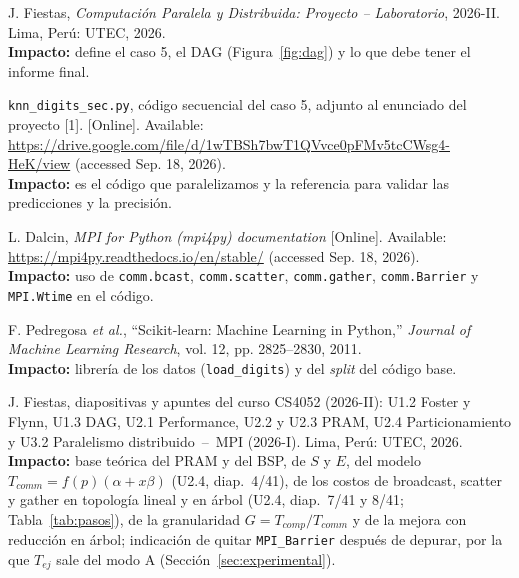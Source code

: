 \documentclass[11pt,a4paper]{article}
\begin{document}
\begin{enumerate}[label={[\arabic*]}, leftmargin=*, itemsep=2pt, parsep=0pt, topsep=2pt]
  \item J. Fiestas, \textit{Computación Paralela y Distribuida: Proyecto -- Laboratorio}, 2026-II. Lima, Perú: UTEC, 2026.\\
  \textbf{Impacto:} define el caso 5, el DAG (Figura~\ref{fig:dag}) y lo que debe tener el informe final.

  \item \texttt{knn\_digits\_sec.py}, código secuencial del caso 5, adjunto al enunciado del proyecto [1]. [Online]. Available: \url{https://drive.google.com/file/d/1wTBSh7bwT1QVvce0pFMv5tcCWsg4-HeK/view} (accessed Sep. 18, 2026).\\
  \textbf{Impacto:} es el código que paralelizamos y la referencia para validar las predicciones y la precisión.

  \item L. Dalcin, \textit{MPI for Python (mpi4py) documentation} [Online]. Available: \url{https://mpi4py.readthedocs.io/en/stable/} (accessed Sep. 18, 2026).\\
  \textbf{Impacto:} uso de \texttt{comm.bcast}, \texttt{comm.scatter}, \texttt{comm.gather}, \texttt{comm.Barrier} y \texttt{MPI.Wtime} en el código.

  \item F. Pedregosa \textit{et al.}, ``Scikit-learn: Machine Learning in Python,'' \textit{Journal of Machine Learning Research}, vol. 12, pp. 2825--2830, 2011.\\
  \textbf{Impacto:} librería de los datos (\texttt{load\_digits}) y del \textit{split} del código base.

  \item J. Fiestas, diapositivas y apuntes del curso CS4052 (2026-II): U1.2 Foster y Flynn, U1.3 DAG, U2.1 Performance, U2.2 y U2.3 PRAM, U2.4 Particionamiento y U3.2 Paralelismo distribuido~--~MPI (\mbox{2026-I}). Lima, Perú: UTEC, 2026.\\
  \textbf{Impacto:} base teórica del PRAM y del BSP, de $S$ y $E$, del modelo $T_{comm} = f(p)(\alpha + x\beta)$ (U2.4, diap.~4/41), de los costos de broadcast, scatter y gather en topología lineal y en árbol (U2.4, diap.~7/41 y 8/41; Tabla~\ref{tab:pasos}), de la granularidad $G = T_{comp}/T_{comm}$ y de la mejora con reducción en árbol; indicación de quitar \texttt{MPI\_Barrier} después de depurar, por la que $T_{ej}$ sale del modo A (Sección~\ref{sec:experimental}).


\end{enumerate}
\end{document}
